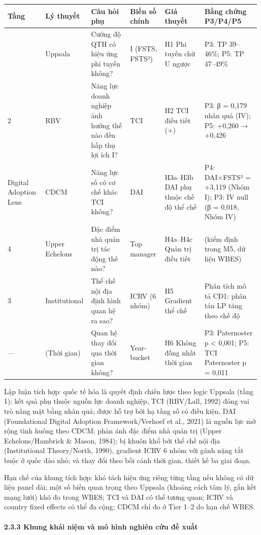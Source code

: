 \documentclass[12pt,a4paper]{article}
\begin{document}
\begin{longtable}[]{@{}llllll@{}}
\toprule\noalign{}
Tầng & Lý thuyết & Câu hỏi phụ & Biến số chính & Giả thuyết & Bằng chứng
P3/P4/P5 \\
\midrule\noalign{}
\endhead
\bottomrule\noalign{}
\endlastfoot
1 & Uppsala & Cường độ QTH có hiệu ứng phi tuyến không? & I (FSTS,
FSTS²) & H1 Phi tuyến chữ U ngược & P3: TP 39--46\%; P5: TP 47--49\% \\
2 & RBV & Năng lực doanh nghiệp ảnh hưởng thế nào đến hấp thụ lợi ích I?
& TCI & H2 TCI điều tiết (+) & P3: β = 0,179 nhân quả (IV); P5: +0,260 →
+0,426 \\
Digital Adoption Lens & CDCM & Năng lực số có cơ chế khác TCI không? &
DAI & H3a--H3b DAI phụ thuộc chế độ thể chế & P4: DAI×FSTS² = +3,119
(Nhóm I); P3: IV null (β = 0,018, Nhóm IV) \\
4 & Upper Echelons & Đặc điểm nhà quản trị tác động thế nào? & Top
manager & H4a--H4c Quản trị điều tiết & (kiểm định trong M5, dữ liệu
WBES) \\
3 & Institutional & Thể chế nội địa định hình quan hệ ra sao? & ICRV (6
nhóm) & H5 Gradient thể chế & Phân tích mô tả CĐ1: phân tán LP tăng theo
chế độ \\
--- & (Thời gian) & Quan hệ thay đổi qua thời gian không? & Year-bucket
& H6 Không đồng nhất thời gian & P3: Paternoster p \textless{} 0,001;
P5: TCI Paternoster p = 0,011 \\
\end{longtable}

Lập luận tích hợp: quốc tế hóa là quyết định chiến lược theo logic
Uppsala (tầng 1); kết quả phụ thuộc nguồn lực doanh nghiệp, TCI
(RBV/Lall, 1992) đóng vai trò nâng mặt bằng nhân quả; được hỗ trợ bởi hạ
tầng số có điều kiện, DAI (Foundational Digital Adoption
Framework/Verhoef et al., 2021) là nguồn lực mở rộng tình huống theo
CDCM; phản ánh đặc điểm nhà quản trị (Upper Echelons/Hambrick \& Mason,
1984); bị khuôn khổ bởi thể chế nội địa (Institutional Theory/North,
1990), gradient ICRV 6 nhóm với gánh nặng tắt buộc ở quốc đảo nhỏ; và
thay đổi theo bối cảnh thời gian, thiết kế ba giai đoạn.

Hạn chế của khung tích hợp: khó tách hiệu ứng riêng từng tầng nếu không
có dữ liệu panel dài; một số biến quan trọng theo Uppsala (khoảng cách
tâm lý, gắn kết mạng lưới) khó đo trong WBES; TCI và DAI có thể tương
quan; ICRV và country fixed effects có thể đa cộng; CDCM chỉ đo ở Tier
1--2 do hạn chế WBES.

\hypertarget{233-khung-khuxe1i-niux1ec7m-vuxe0-muxf4-huxecnh-nghiuxean-cux1ee9u-ux111ux1ec1-xuux1ea5t}{%
\paragraph{2.3.3 Khung khái niệm và mô hình nghiên cứu đề
xuất}\label{233-khung-khuxe1i-niux1ec7m-vuxe0-muxf4-huxecnh-nghiuxean-cux1ee9u-ux111ux1ec1-xuux1ea5t}}
\end{document}
